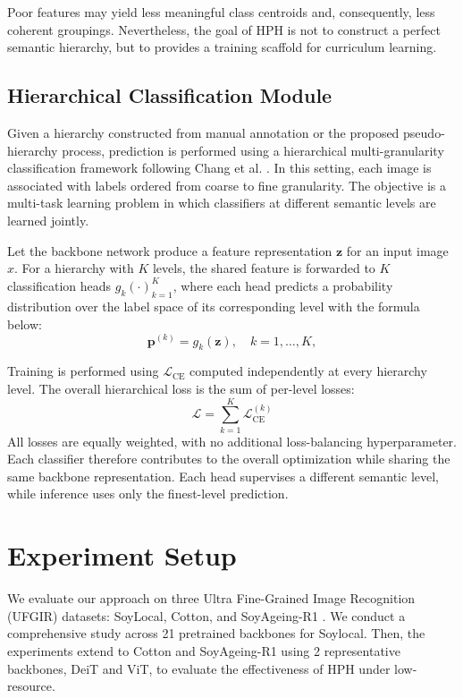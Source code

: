 \documentclass[conference,a4paper]{IEEEtran}
\begin{document}
Poor features may yield less meaningful class centroids and, consequently, less coherent groupings. Nevertheless, the goal of HPH is not to construct a perfect semantic hierarchy, but to provides a training scaffold for curriculum learning.


\subsection{Hierarchical Classification Module}
Given a hierarchy constructed from manual annotation or the proposed pseudo-hierarchy process, prediction is performed using a hierarchical multi-granularity classification framework following Chang et al. \cite{chang_your_2021}. In this setting, each image is associated with labels ordered from coarse to fine granularity. The objective is a multi-task learning problem in which classifiers at different semantic levels are learned jointly.

Let the backbone network produce a feature representation $\mathbf{z}$ for an input image $x$. For a hierarchy with $K$ levels, the shared feature is forwarded to $K$ classification heads ${g_k(\cdot)}_{k=1}^{K}$, where each head predicts a probability distribution over the label space of its corresponding level with the formula below:
\[
\mathbf{p}^{(k)} = g_k(\mathbf{z}), \quad k = 1, \dots, K,
\]

Training is performed using $\mathcal{L}_{\text{CE}}$ computed independently at every hierarchy level. The overall hierarchical loss is the sum of per-level losses:
\[
\mathcal{L} = \sum_{k=1}^{K} \mathcal{L}_{\mathrm{CE}}^{(k)}
\]
All losses are equally weighted, with no additional loss-balancing hyperparameter. Each classifier therefore contributes to the overall optimization while sharing the same backbone representation. Each head supervises a different semantic level, while inference uses only the finest-level prediction.

\section{Experiment Setup}
\label{sec_setup}

We evaluate our approach on three Ultra Fine-Grained Image Recognition (UFGIR) datasets: SoyLocal, Cotton, and SoyAgeing-R1 \cite{yu_benchmark_2021}. We conduct a comprehensive study across 21 pretrained backbones for Soylocal. Then, the experiments extend to Cotton and SoyAgeing-R1 using 2 representative backbones, DeiT and ViT, to evaluate the effectiveness of HPH under low-resource.
\end{document}
